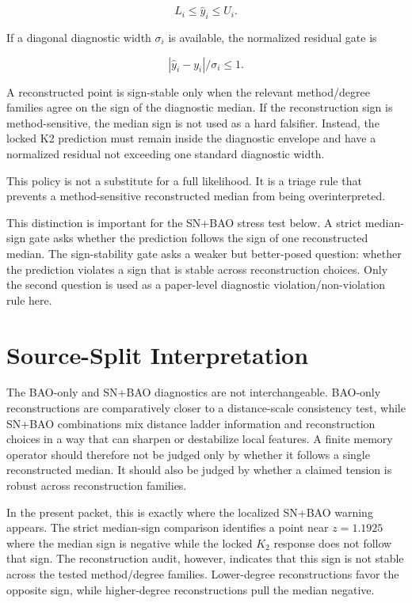 \documentclass[11pt]{article}
\begin{document}
\[
L_i \leq \hat y_i \leq U_i .
\]

If a diagonal diagnostic width $\sigma_i$ is available, the normalized residual
gate is

\[
\left|\hat y_i-y_i\right|/\sigma_i \leq 1 .
\]

A reconstructed point is sign-stable only when the relevant method/degree
families agree on the sign of the diagnostic median. If the reconstruction
sign is method-sensitive, the median sign is not used as a hard falsifier.
Instead, the locked K2 prediction must remain inside the diagnostic envelope
and have a normalized residual not exceeding one standard diagnostic width.

This policy is not a substitute for a full likelihood. It is a triage rule that
prevents a method-sensitive reconstructed median from being overinterpreted.

This distinction is important for the SN+BAO stress test below. A strict
median-sign gate asks whether the prediction follows the sign of one
reconstructed median. The sign-stability gate asks a weaker but better-posed
question: whether the prediction violates a sign that is stable across
reconstruction choices. Only the second question is used as a paper-level
diagnostic violation/non-violation rule here.

\section{Source-Split Interpretation}

The BAO-only and SN+BAO diagnostics are not interchangeable. BAO-only
reconstructions are comparatively closer to a distance-scale consistency test,
while SN+BAO combinations mix distance ladder information and reconstruction
choices in a way that can sharpen or destabilize local features. A finite
memory operator should therefore not be judged only by whether it follows a
single reconstructed median. It should also be judged by whether a claimed
tension is robust across reconstruction families.

In the present packet, this is exactly where the localized SN+BAO warning
appears. The strict median-sign comparison identifies a point near $z=1.1925$
where the median sign is negative while the locked $K_2$ response does not follow
that sign. The reconstruction audit, however, indicates that this sign is not
stable across the tested method/degree families. Lower-degree reconstructions
favor the opposite sign, while higher-degree reconstructions pull the median
negative.
\end{document}
